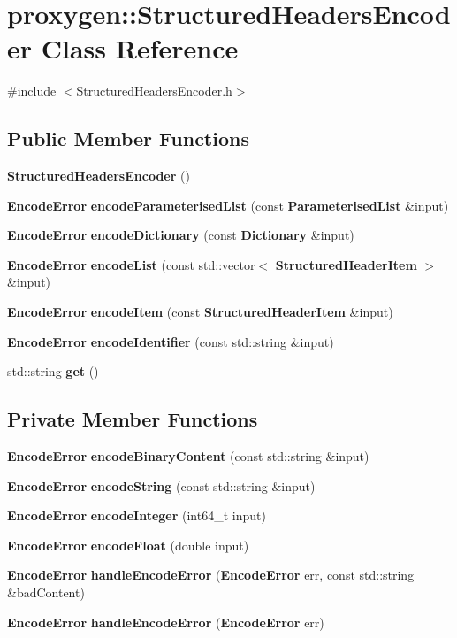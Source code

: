 \section{proxygen\+:\+:Structured\+Headers\+Encoder Class Reference}
\label{classproxygen_1_1StructuredHeadersEncoder}


{\ttfamily \#include $<$Structured\+Headers\+Encoder.\+h$>$}

\subsection*{Public Member Functions}
\begin{DoxyCompactItemize}
\item 
{\bf Structured\+Headers\+Encoder} ()
\item 
{\bf Encode\+Error} {\bf encode\+Parameterised\+List} (const {\bf Parameterised\+List} \&input)
\item 
{\bf Encode\+Error} {\bf encode\+Dictionary} (const {\bf Dictionary} \&input)
\item 
{\bf Encode\+Error} {\bf encode\+List} (const std\+::vector$<$ {\bf Structured\+Header\+Item} $>$ \&input)
\item 
{\bf Encode\+Error} {\bf encode\+Item} (const {\bf Structured\+Header\+Item} \&input)
\item 
{\bf Encode\+Error} {\bf encode\+Identifier} (const std\+::string \&input)
\item 
std\+::string {\bf get} ()
\end{DoxyCompactItemize}
\subsection*{Private Member Functions}
\begin{DoxyCompactItemize}
\item 
{\bf Encode\+Error} {\bf encode\+Binary\+Content} (const std\+::string \&input)
\item 
{\bf Encode\+Error} {\bf encode\+String} (const std\+::string \&input)
\item 
{\bf Encode\+Error} {\bf encode\+Integer} (int64\+\_\+t input)
\item 
{\bf Encode\+Error} {\bf encode\+Float} (double input)
\item 
{\bf Encode\+Error} {\bf handle\+Encode\+Error} ({\bf Encode\+Error} err, const std\+::string \&bad\+Content)
\item 
{\bf Encode\+Error} {\bf handle\+Encode\+Error} ({\bf Encode\+Error} err)
\end{DoxyCompactItemize}
